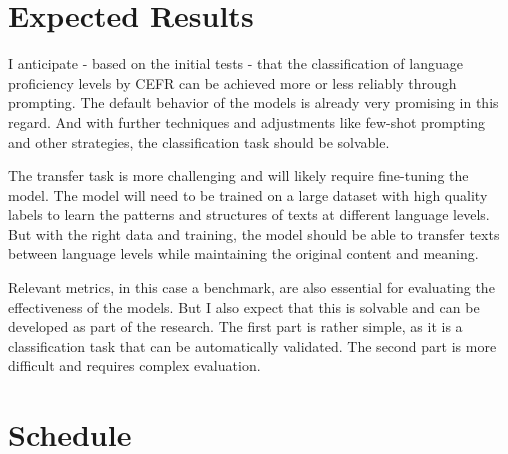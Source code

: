 \documentclass{article}
\begin{document}
\section{Expected Results}
I anticipate - based on the initial tests - that the classification of language proficiency levels by CEFR can 
be achieved more or less reliably through prompting. The default behavior of the models is already
very promising in this regard. And with further techniques and adjustments like few-shot prompting
and other strategies, the classification task should be solvable. 

The transfer task is more challenging and will likely require fine-tuning the model. The model
will need to be trained on a large dataset with high quality labels to learn the patterns and
structures of texts at different language levels. But with the right data and training, the model
should be able to transfer texts between language levels while maintaining the original content
and meaning.

Relevant metrics, in this case a benchmark, are also essential for evaluating the effectiveness of
the models. But I also expect that this is solvable and can be developed as part of the research.
The first part is rather simple, as it is a classification task that can be automatically validated.
The second part is more difficult and requires complex evaluation.


\section{Schedule}
\end{document}
